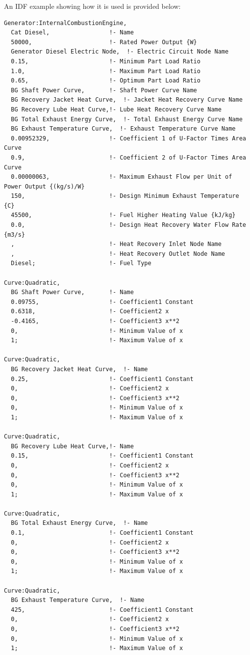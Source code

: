 An IDF example showing how it is used is provided below:

\begin{lstlisting}
Generator:InternalCombustionEngine,
  Cat Diesel,                 !- Name
  50000,                      !- Rated Power Output {W}
  Generator Diesel Electric Node,  !- Electric Circuit Node Name
  0.15,                       !- Minimum Part Load Ratio
  1.0,                        !- Maximum Part Load Ratio
  0.65,                       !- Optimum Part Load Ratio
  BG Shaft Power Curve,       !- Shaft Power Curve Name
  BG Recovery Jacket Heat Curve,  !- Jacket Heat Recovery Curve Name
  BG Recovery Lube Heat Curve,!- Lube Heat Recovery Curve Name
  BG Total Exhaust Energy Curve,  !- Total Exhaust Energy Curve Name
  BG Exhaust Temperature Curve,  !- Exhaust Temperature Curve Name
  0.00952329,                 !- Coefficient 1 of U-Factor Times Area Curve
  0.9,                        !- Coefficient 2 of U-Factor Times Area Curve
  0.00000063,                 !- Maximum Exhaust Flow per Unit of Power Output {(kg/s)/W}
  150,                        !- Design Minimum Exhaust Temperature {C}
  45500,                      !- Fuel Higher Heating Value {kJ/kg}
  0.0,                        !- Design Heat Recovery Water Flow Rate {m3/s}
  ,                           !- Heat Recovery Inlet Node Name
  ,                           !- Heat Recovery Outlet Node Name
  Diesel;                     !- Fuel Type

Curve:Quadratic,
  BG Shaft Power Curve,       !- Name
  0.09755,                    !- Coefficient1 Constant
  0.6318,                     !- Coefficient2 x
  -0.4165,                    !- Coefficient3 x**2
  0,                          !- Minimum Value of x
  1;                          !- Maximum Value of x

Curve:Quadratic,
  BG Recovery Jacket Heat Curve,  !- Name
  0.25,                       !- Coefficient1 Constant
  0,                          !- Coefficient2 x
  0,                          !- Coefficient3 x**2
  0,                          !- Minimum Value of x
  1;                          !- Maximum Value of x

Curve:Quadratic,
  BG Recovery Lube Heat Curve,!- Name
  0.15,                       !- Coefficient1 Constant
  0,                          !- Coefficient2 x
  0,                          !- Coefficient3 x**2
  0,                          !- Minimum Value of x
  1;                          !- Maximum Value of x

Curve:Quadratic,
  BG Total Exhaust Energy Curve,  !- Name
  0.1,                        !- Coefficient1 Constant
  0,                          !- Coefficient2 x
  0,                          !- Coefficient3 x**2
  0,                          !- Minimum Value of x
  1;                          !- Maximum Value of x

Curve:Quadratic,
  BG Exhaust Temperature Curve,  !- Name
  425,                        !- Coefficient1 Constant
  0,                          !- Coefficient2 x
  0,                          !- Coefficient3 x**2
  0,                          !- Minimum Value of x
  1;                          !- Maximum Value of x
\end{lstlisting}

